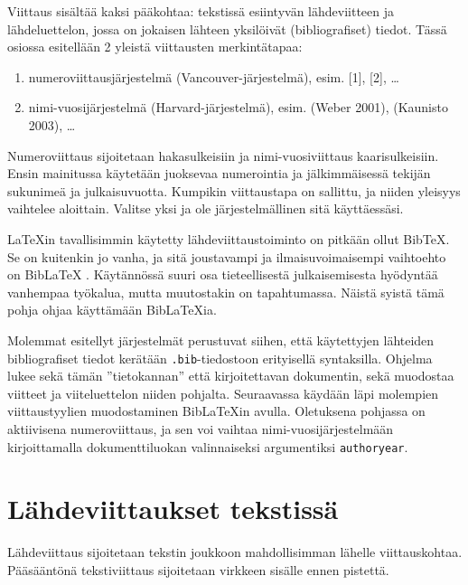 Viittaus sisältää kaksi pääkohtaa: tekstissä esiintyvän lähdeviitteen ja lähdeluettelon, jossa on jokaisen lähteen yksilöivät (bibliografiset) tiedot. Tässä osiossa esitellään 2 yleistä viittausten merkintätapaa:
\begin{enumerate}
    \item numeroviittausjärjestelmä (Vancouver-järjestelmä), esim. [1], [2], \ldots
    \item nimi-vuosijärjestelmä (Harvard-järjestelmä), esim. (Weber 2001), (Kaunisto 2003), \ldots
\end{enumerate}
Numeroviittaus sijoitetaan hakasulkeisiin ja nimi-vuosiviittaus kaarisulkeisiin. Ensin mainitussa käytetään juoksevaa numerointia ja jälkimmäisessä tekijän sukunimeä ja julkaisuvuotta. Kumpikin viittaustapa on sallittu, ja niiden yleisyys vaihtelee aloittain. Valitse yksi ja ole järjestelmällinen sitä käyttäessäsi.

\LaTeX{}in tavallisimmin käytetty lähdeviittaustoiminto on pitkään ollut Bib\TeX. Se on kuitenkin jo vanha, ja sitä joustavampi ja ilmaisuvoimaisempi vaihtoehto on Bib\LaTeX{} . Käytännössä suuri osa tieteellisestä julkaisemisesta hyödyntää vanhempaa työkalua, mutta muutostakin on tapahtumassa. Näistä syistä tämä pohja ohjaa käyttämään Bib\LaTeX{}ia.

Molemmat esitellyt järjestelmät perustuvat siihen, että käytettyjen lähteiden bibliografiset tiedot kerätään \texttt{.bib}-tiedostoon erityisellä syntaksilla. Ohjelma lukee sekä tämän ''tietokannan'' että kirjoitettavan dokumentin, sekä muodostaa viitteet ja viiteluettelon niiden pohjalta. Seuraavassa käydään läpi molempien viittaustyylien muodostaminen Bib\LaTeX{}in avulla. Oletuksena pohjassa on aktiivisena numeroviittaus, ja sen voi vaihtaa nimi-vuosi\-järjestelmään kirjoittamalla dokumenttiluokan valinnaiseksi argumentiksi \texttt{authoryear}.

\section{Lähdeviittaukset tekstissä}

Lähdeviittaus sijoitetaan tekstin joukkoon mahdollisimman lähelle viittauskohtaa. Pääsääntönä tekstiviittaus sijoitetaan virkkeen sisälle ennen pistettä.

